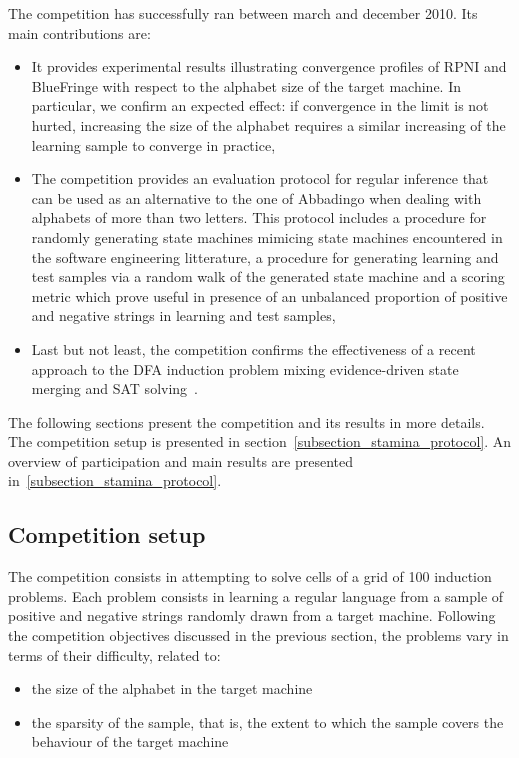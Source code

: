The competition has successfully ran between march and december 2010. Its main contributions are:

\begin{itemize}
\item It provides experimental results illustrating convergence profiles of RPNI and BlueFringe with respect to the alphabet size of the target machine. In particular, we confirm an expected effect: if convergence in the limit is not hurted, increasing the size of the alphabet requires a similar increasing of the learning sample to converge in practice,
\item The competition provides an evaluation protocol for regular inference that can be used as an alternative to the one of Abbadingo when dealing with alphabets of more than two letters. This protocol includes a procedure for randomly generating state machines mimicing state machines encountered in the software engineering litterature, a procedure for generating learning and test samples via a random walk of the generated state machine and a scoring metric which prove useful in presence of an unbalanced proportion of positive and negative strings in learning and test samples,
\item Last but not least, the competition confirms the effectiveness of a recent approach to the DFA induction problem mixing evidence-driven state merging and SAT solving~\cite{Heule10}.
\end{itemize}

The following sections present the competition and its results in more details. The competition setup is presented in section~\ref{subsection_stamina_protocol}. An overview of participation and main results are presented in~\ref{subsection_stamina_protocol}.

\subsection{Competition setup\label{subsection_stamina_protocol}}

The competition consists in attempting to solve cells of a grid of 100 induction problems. Each problem consists in learning a regular language from a sample of positive and negative strings randomly drawn from a target machine. Following the competition objectives discussed in the previous section, the problems vary in terms of their difficulty, related to:

\begin{itemize}
\item the size of the alphabet in the target machine
\item the sparsity of the sample, that is, the extent to which the sample covers the behaviour of the target machine
\end{itemize}


